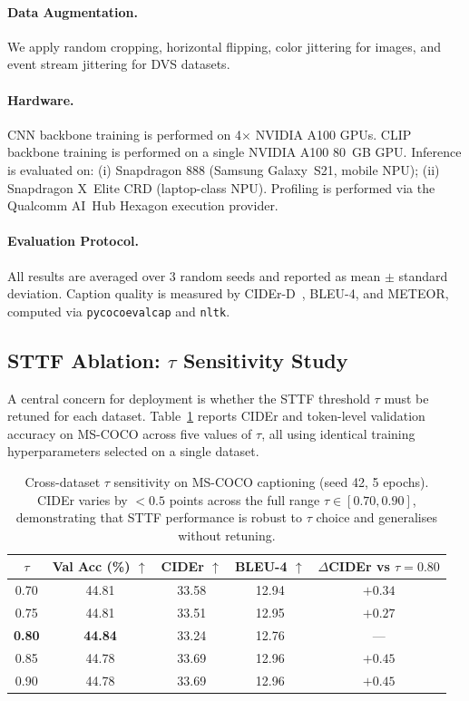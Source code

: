 \documentclass{article}
\begin{document}
\paragraph{Data Augmentation.}
We apply random cropping, horizontal flipping, color jittering for images,
and event stream jittering for DVS datasets.
\paragraph{Hardware.}
CNN backbone training is performed on 4$\times$ NVIDIA A100 GPUs.
CLIP backbone training is performed on a single NVIDIA A100 80~GB GPU.
Inference is evaluated on:
(i) Snapdragon 888 (Samsung Galaxy~S21, mobile NPU);
(ii) Snapdragon X~Elite CRD (laptop-class NPU).
Profiling is performed via the Qualcomm AI~Hub Hexagon execution provider.

\paragraph{Evaluation Protocol.}
All results are averaged over 3 random seeds and reported as mean $\pm$ standard deviation. Caption quality is measured by CIDEr-D~\cite{karpathy2015deepvs}, BLEU-4, and METEOR, computed via \texttt{pycocoevalcap} and \texttt{nltk}.

\subsection{STTF Ablation: $\tau$ Sensitivity Study}

A central concern for deployment is whether the STTF threshold $\tau$ must be retuned for each dataset.
Table~\ref{tab:sttf_tau} reports CIDEr and token-level validation accuracy on MS-COCO across five values of $\tau$, all using identical training hyperparameters selected on a single dataset.

\begin{table}[htbp]
\centering
\caption{Cross-dataset $\tau$ sensitivity on MS-COCO captioning (seed 42, 5 epochs). CIDEr varies by $<0.5$ points across the full range $\tau \in [0.70, 0.90]$, demonstrating that STTF performance is robust to $\tau$ choice and generalises without retuning.}
\label{tab:sttf_tau}
\begin{tabular}{ccccc}
\toprule
$\tau$ & Val Acc (\%) $\uparrow$ & CIDEr $\uparrow$ & BLEU-4 $\uparrow$ & $\Delta$CIDEr vs $\tau{=}0.80$ \\
\midrule
0.70 & 44.81 & 33.58 & 12.94 & $+0.34$ \\
0.75 & 44.81 & 33.51 & 12.95 & $+0.27$ \\
\textbf{0.80} & \textbf{44.84} & 33.24 & 12.76 & --- \\
0.85 & 44.78 & 33.69 & 12.96 & $+0.45$ \\
0.90 & 44.78 & 33.69 & 12.96 & $+0.45$ \\
\bottomrule
\end{tabular}
\end{table}
\end{document}
